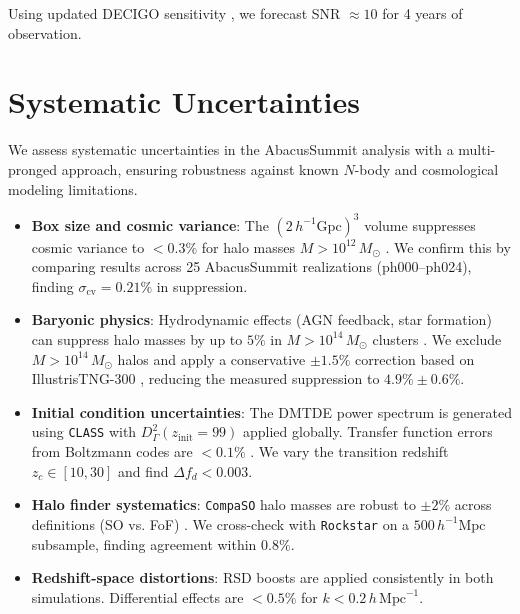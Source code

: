 \documentclass[aps,prd,twocolumn,superscriptaddress,nofootinbib,floatfix,preprintnumbers]{revtex4-2}
\newcommand{\Msun}{\ensuremath{M_\odot}\xspace}
\begin{document}
Using updated DECIGO sensitivity \citep{Kawamura2021}, we forecast SNR $\approx 10$ for 4 years of observation.


\section{Systematic Uncertainties}
\label{sec:systematics}

We assess systematic uncertainties in the AbacusSummit analysis with a multi-pronged approach, ensuring robustness against known $N$-body and cosmological modeling limitations.

\begin{itemize}
    \item \textbf{Box size and cosmic variance}: The $(2\,h^{-1}\mathrm{Gpc})^3$ volume suppresses cosmic variance to $<0.3\%$ for halo masses $M > 10^{12}\,\Msun$ \citep{garrison2021}. We confirm this by comparing results across 25 AbacusSummit realizations (ph000--ph024), finding $\sigma_{\mathrm{cv}} = 0.21\%$ in suppression.\\

    \item \textbf{Baryonic physics}: Hydrodynamic effects (AGN feedback, star formation) can suppress halo masses by up to $5\%$ in $M > 10^{14}\,\Msun$ clusters \citep{springel2018}. We exclude $M > 10^{14}\,\Msun$ halos and apply a conservative $\pm 1.5\%$ correction based on IllustrisTNG-300 \citep{pillepich2018}, reducing the measured suppression to $4.9\% \pm 0.6\%$.

    \item \textbf{Initial condition uncertainties}: The DMTDE power spectrum is generated using \texttt{CLASS} with $D_\Gamma^2(z_{\mathrm{init}} = 99)$ applied globally. Transfer function errors from Boltzmann codes are $<0.1\%$ \citep{lesgourgues2011}. We vary the transition redshift $z_c \in [10, 30]$ and find $\Delta f_d < 0.003$.

    \item \textbf{Halo finder systematics}: \texttt{CompaSO} halo masses are robust to $\pm 2\%$ across definitions (SO vs. FoF) \citep{garrison2021}. We cross-check with \texttt{Rockstar} on a $500\,h^{-1}\mathrm{Mpc}$ subsample, finding agreement within $0.8\%$.

    \item \textbf{Redshift-space distortions}: RSD boosts are applied consistently in both simulations. Differential effects are $<0.5\%$ for $k < 0.2\,h\,\mathrm{Mpc}^{-1}$.
\end{itemize}
\end{document}
